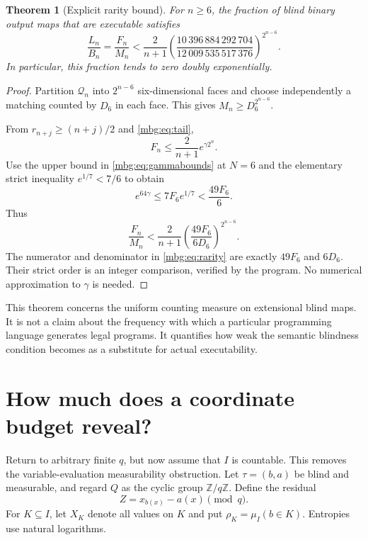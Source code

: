 \documentclass[11pt,letterpaper]{article}
\newtheorem{theorem}{Theorem}[section]
\theoremstyle{definition}
\begin{document}
\begin{theorem}[Explicit rarity bound]
\label{mbg:thm:rarity}
For $n\ge6$, the fraction of blind binary output maps that are executable satisfies
\begin{equation}
 \frac{L_n}{B_n}=\frac{F_n}{M_n}
 <\frac2{n+1}
 \left(\frac{10\,396\,884\,292\,704}
            {12\,009\,535\,517\,376}\right)^{2^{n-6}}.
 \label{mbg:eq:rarity}
\end{equation}
In particular, this fraction tends to zero doubly exponentially.
\end{theorem}
\begin{proof}
Partition $\mathcal Q_n$ into $2^{n-6}$ six-dimensional faces and choose independently a matching counted by $D_6$ in each face. This gives
$M_n\ge D_6^{2^{n-6}}$.

From $r_{n+j}\ge(n+j)/2$ and \eqref{mbg:eq:tail},
\[
 F_n\le\frac2{n+1}e^{\gamma2^n}.
\]
Use the upper bound in \eqref{mbg:eq:gammabounds} at $N=6$ and the elementary strict inequality $e^{1/7}<7/6$ to obtain
\[
 e^{64\gamma}\le7F_6e^{1/7}<\frac{49F_6}{6}.
\]
Thus
\[
 \frac{F_n}{M_n}<\frac2{n+1}
          \left(\frac{49F_6}{6D_6}\right)^{2^{n-6}}.
\]
The numerator and denominator in \eqref{mbg:eq:rarity} are exactly $49F_6$ and $6D_6$. Their strict order is an integer comparison, verified by the program. No numerical approximation to $\gamma$ is needed.
\end{proof}

This theorem concerns the uniform counting measure on extensional blind maps. It is not a claim about the frequency with which a particular programming language generates legal programs. It quantifies how weak the semantic blindness condition becomes as a substitute for actual executability.

\section{How much does a coordinate budget reveal?}
\label{mbg:sec:information}

Return to arbitrary finite $q$, but now assume that $I$ is countable. This removes the variable-evaluation measurability obstruction. Let $\tau=(b,a)$ be blind and measurable, and regard $Q$ as the cyclic group $\mathbb Z/q\mathbb Z$. Define the residual
\[
 Z=x_{b(x)}-a(x)\pmod q.
\]
For $K\subseteq I$, let $X_K$ denote all values on $K$ and put $\rho_K=\mu_I(b\in K)$. Entropies use natural logarithms.
\end{document}

